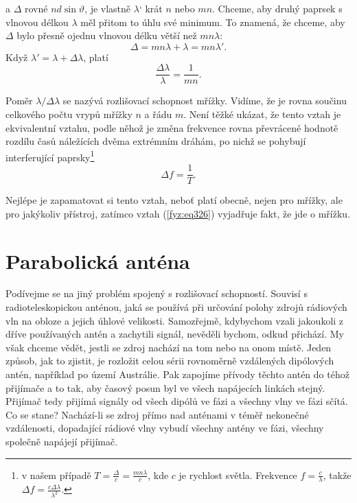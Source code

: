    a \(\Delta\) rovné \(nd\sin\vartheta\), je vlastně \(\lambda‘\) krát \(n\) nebo \(mn\). Chceme, 
    aby druhý paprsek s vlnovou délkou \(\lambda\) měl přitom to úhlu své minimum. To znamená, že 
    chceme, aby \(\Delta\) bylo přesně ojednu vlnovou délku větší než \(mn\lambda\):
    \begin{equation*}
      \Delta = mn\lambda + \lambda = mn\lambda'.
    \end{equation*}
    Když \(\lambda' = \lambda + \Delta\lambda\), platí
    \begin{equation}\label{fyz:eq326}
      \frac{\Delta\lambda}{\lambda} = \frac{1}{mn}.
    \end{equation}
    
    Poměr \(\lambda/\Delta\lambda\) se nazývá rozlišovací schopnost mřížky. Vidíme, že je rovna 
    součinu celkového počtu vrypů mřížky \(n\) a řádu \(m\). Není těžké ukázat, že tento vztah je 
    ekvivalentní vztahu, podle něhož je změna frekvence rovna převrácené hodnotě rozdílu časů 
    náležících dvěma extrémním dráhám, po nichž se pohybují interferující paprsky\footnote{v našem 
    případě \(T=\frac{\Delta}{c} = \frac{mn\lambda}{c}\), kde \(c\) je rychlost světla. Frekvence 
    \(f = \frac{c}{\lambda}\), takže \(\Delta f = \frac{c\Delta\lambda}{\lambda^2}\).}
    \begin{equation*}
      \Delta f =\frac{1}{T}.
    \end{equation*}
    
    Nejlépe je zapamatovat si tento vztah, neboť platí obecně, nejen pro mřížky, ale pro jakýkoliv 
    přístroj, zatímco vztah (\ref{fyz:eq326}) vyjadřuje fakt, že jde o mřížku.
    
  \section{Parabolická anténa}\label{fyz:IchapXXXsecIV}
    Podívejme se na jiný problém spojený s rozlišovací schopností. Souvisí s radioteleskopickou 
    anténou, jaká se používá při určování polohy zdrojů rádiových vln na obloze a jejich úhlové 
    velikosti. Samozřejmě, kdybychom vzali jakoukoli z dříve používaných antén a zachytili signál, 
    nevěděli bychom, odkud přichází. My však chceme vědět, jestli se zdroj nachází na tom nebo na 
    onom místě. Jeden způsob, jak to zjistit, je rozložit celou sérii rovnoměrně vzdálených 
    dipólových antén, například po území Austrálie. Pak zapojíme přívody těchto antén do téhož 
    přijímače a to tak, aby časový posun byl ve všech napájecích linkách stejný. Přijímač tedy 
    přijímá signály od všech dipólů ve fázi a všechny vlny ve fázi sčítá. Co se stane? Nachází-li 
    se zdroj přímo nad anténami v téměř nekonečné vzdálenosti, dopadající rádiové vlny vybudí 
    všechny antény ve fázi, všechny společně napájejí přijímač. 
    
